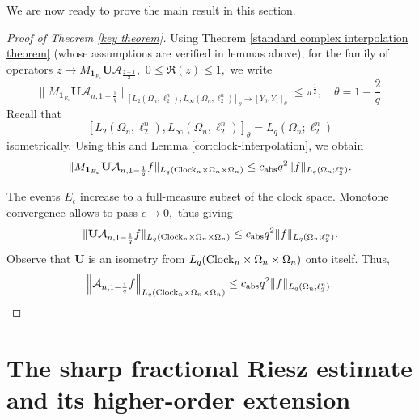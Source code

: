 \documentclass{amsart}
\numberwithin{equation}{section}
\theoremstyle{definition}
\theoremstyle{remark}
\newcommand{\1}{\mathbf 1}
\begin{document}
We are now ready to prove the main result in this section.

\begin{proof}[Proof of Theorem \ref{key theorem}] Using Theorem \ref{standard complex interpolation theorem} (whose assumptions are verified in lemmas above), for the family of operators $z\to M_{\1_{E_{\epsilon}}}\mathbf{U}\mathcal{A}_{\frac{z+1}{2}},$ $0\leq\Re(z)\leq 1,$ we write
$$\|M_{\1_{E_{\epsilon}}}\mathbf{U}\mathcal{A}_{n,1-\frac1q}\|_{[L_2(\Omega_n,\ell^{n}_{2}),L_{\infty}(\Omega_n,\ell^{n}_{2})]_{\theta}\to [Y_0,Y_1]_{\theta}}
 \leq\pi^{\frac12},\quad \theta=1-\frac{2}{q}.$$
Recall that
$$[L_2(\Omega_n,\ell^{n}_{2}),L_{\infty}(\Omega_n,\ell^{n}_{2})]_{\theta}=L_q(\Omega_n;\ell^{n}_{2})$$
isometrically. Using this and Lemma \ref{cor:clock-interpolation}, we obtain
$$\|M_{\1_{E_{\epsilon}}}\mathbf{U}\mathcal{A}_{n,1-\frac1q}f\|_{L_q({\rm Clock}_n\times\Omega_n\times\Omega_n)}
 \leq c_{{\rm abs}}q^2\|f\|_{L_q(\Omega_n;\ell^{n}_{2})}.$$


The events $E_{\epsilon}$ increase to a full-measure subset of the clock space. Monotone convergence allows to pass $\epsilon\to 0,$ thus giving
$$\|\mathbf{U}\mathcal{A}_{n,1-\frac1q}f\|_{L_q({\rm Clock}_n\times\Omega_n\times\Omega_n)}
 \leq c_{{\rm abs}}q^2\|f\|_{L_q(\Omega_n;\ell^{n}_{2})}.$$
Observe that $\mathbf{U}$ is an isometry from $L_q({\rm Clock}_n\times\Omega_{n}\times\Omega_{n})$ onto itself. Thus,
$$\left\|\mathcal{A}_{n,1-\frac1q}f\right\|_{L_q({\rm Clock}_n\times\Omega_n\times\Omega_n)}
 \leq c_{{\rm abs}}q^2\|f\|_{L_q(\Omega_n;\ell^{n}_{2})}.$$
\end{proof}

\section{The sharp fractional Riesz estimate and its higher-order extension}\label{main result section}
\end{document}
